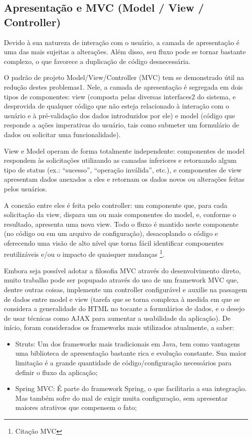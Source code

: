 \documentclass[11pt]{book}
\begin{document}
\subsection{Apresentação e MVC (Model / View / Controller)}

Devido à sua natureza de interação com o usuário, a camada de apresentação é uma das mais sujeitas a alterações. Além disso, seu fluxo pode se tornar bastante complexo, o que favorece a duplicação de código desnecessária.

O padrão de projeto Model/View/Controller (MVC) tem se demonstrado útil na redução destes problemas1. Nele, a camada de apresentação é segregada em dois tipos de componentes: view (composta pelas diversas interfaces2 do sistema, e desprovida de qualquer código que não esteja relacionado à interação com o usuário e à pré-validação dos dados introduzidos por ele) e model (código que responde a ações imperativas do usuário, tais como submeter um formulário de dados ou solicitar uma funcionalidade).

View e Model operam de forma totalmente independente: componentes de model respondem às solicitações utilizando as camadas inferiores e retornando algum tipo de status (ex.: “sucesso”, “operação inválida”, etc.), e componentes de view apresentam dados anexados a eles e retornam os dados novos ou alterações feitas pelos usuários.

A conexão entre eles é feita pelo controller: um componente que, para cada solicitação da view, dispara um ou mais componentes do model, e, conforme o resultado, apresenta uma nova view. Todo o fluxo é mantido neste componente (no código ou em um arquivo de configuração), desacoplando o código e oferecendo uma visão de alto nível que torna fácil identificar componentes reutilizáveis e/ou o impacto de quaisquer mudanças \footnote{Citação MVC}.

Embora seja possível adotar a filosofia MVC através do desenvolvimento direto, muito trabalho pode ser popupado através do uso de um framework MVC que, dentre outras coisas, implemente um controller configurável e auxilie na passagem de dados entre model e view (tarefa que se torna complexa à medida em que se considera a generalidade do HTML no tocante a formulários de dados, e o desejo de usar técnicas como AJAX para aumentar a usabilidade da aplicação). De início, foram considerados os frameworks mais utilizados atualmente, a saber:

\begin{itemize}
\item Struts: Um dos frameworks mais tradicionais em Java, tem como vantagens uma biblioteca de apresentação bastante rica e evolução constante. Sua maior limitação é a grande quantidade de código/configuração necessários para definir o fluxo da aplicação;
\item Spring MVC: É parte do framework Spring, o que facilitaria a sua integração. Mas também sofre do mal de exigir muita configuração, sem apresentar maiores atrativos que compensem o fato;
\end{itemize}
\end{document}
